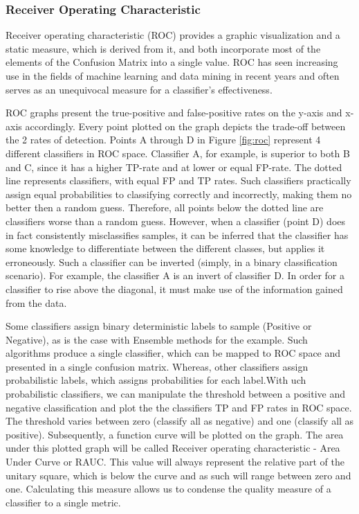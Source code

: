 		
		\subsubsection{Receiver Operating Characteristic}
		Receiver operating characteristic (ROC) provides a graphic visualization and a static measure, which is derived from it, and both incorporate most of the elements of the Confusion Matrix into a single value. ROC has seen increasing use in the fields of machine learning and data mining in recent years and often serves as an unequivocal measure for a classifier's effectiveness.
		
		\par
	
		ROC graphs present the true-positive and false-positive rates on the y-axis and x-axis accordingly. Every point plotted on the graph depicts the trade-off between the 2 rates of detection. Points A through D in Figure \ref{fig:roc} represent 4 different classifiers in ROC space. Classifier A, for example, is superior to both B and C, since it has a higher TP-rate and at lower or equal FP-rate. The dotted line represents classifiers, with equal FP and TP rates. Such classifiers practically assign equal probabilities to classifying correctly and incorrectly, making them no better then a random guess. Therefore, all points below the dotted line are classifiers worse than a random guess. However, when a classifier (point D) does in fact consistently misclassifies samples, it can be inferred that the classifier has some knowledge to differentiate between the different classes, but applies it erroneously. Such a classifier can be inverted (simply, in a binary classification scenario). For example, the classifier A is an invert of classifier D. In order for a classifier to rise above the diagonal, it must make use of the information gained from the data.
		
		\par
		
		Some classifiers assign binary deterministic labels to sample (Positive or Negative), as is the case with Ensemble methods for the example. Such algorithms produce a single classifier, which can be mapped to ROC space and presented in a single confusion matrix. Whereas, other classifiers assign probabilistic labels, which assigns probabilities for each label.With uch probabilistic classifiers, we can manipulate the threshold between a positive and negative classification and plot the the classifiers TP and FP rates in ROC space. The threshold varies between zero (classify all as negative) and one (classify all as positive). Subsequently, a function curve will be plotted on the graph. The area under this plotted graph will be called Receiver operating characteristic - Area Under Curve or RAUC. This value will always represent the relative part of the unitary square, which is below the curve and as such will range between zero and one. Calculating this measure allows us to condense the quality measure of a classifier to a single metric.
		
